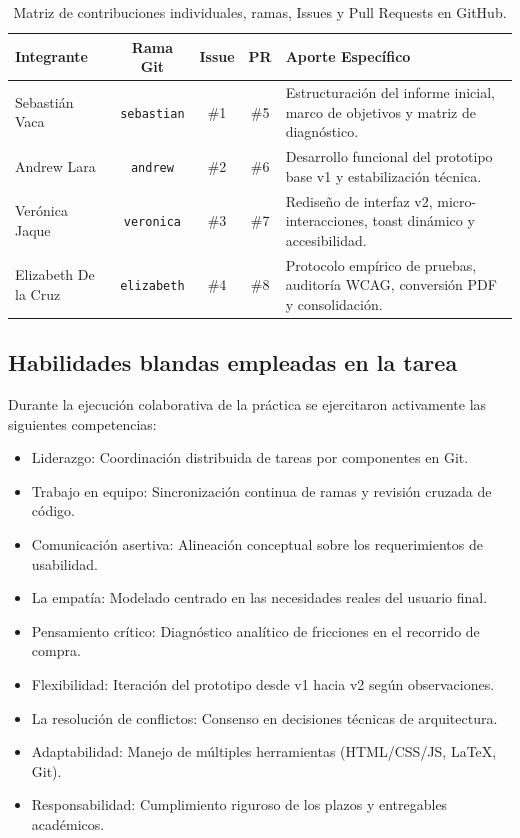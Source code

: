 \documentclass{article}
\begin{document}
\begin{table}[H]
\centering
\caption{Matriz de contribuciones individuales, ramas, Issues y Pull Requests en GitHub.}
\label{tab:github_colaboracion}
\vspace{0.2cm}
\begin{tabularx}{\textwidth}{l c c c X}
\toprule
\textbf{Integrante} & \textbf{Rama Git} & \textbf{Issue} & \textbf{PR} & \textbf{Aporte Específico} \\
\midrule
Sebastián Vaca & \texttt{sebastian} & \#1 & \#5 & Estructuración del informe inicial, marco de objetivos y matriz de diagnóstico. \\
Andrew Lara & \texttt{andrew} & \#2 & \#6 & Desarrollo funcional del prototipo base v1 y estabilización técnica. \\
Verónica Jaque & \texttt{veronica} & \#3 & \#7 & Rediseño de interfaz v2, micro-interacciones, toast dinámico y accesibilidad. \\
Elizabeth De la Cruz & \texttt{elizabeth} & \#4 & \#8 & Protocolo empírico de pruebas, auditoría WCAG, conversión PDF y consolidación. \\
\bottomrule
\end{tabularx}
\end{table}

\subsection{Habilidades blandas empleadas en la tarea}
Durante la ejecución colaborativa de la práctica se ejercitaron activamente las siguientes competencias:
\begin{itemize}
    \item[$\blacksquare$] Liderazgo: Coordinación distribuida de tareas por componentes en Git.
    \item[$\blacksquare$] Trabajo en equipo: Sincronización continua de ramas y revisión cruzada de código.
    \item[$\blacksquare$] Comunicación asertiva: Alineación conceptual sobre los requerimientos de usabilidad.
    \item[$\blacksquare$] La empatía: Modelado centrado en las necesidades reales del usuario final.
    \item[$\blacksquare$] Pensamiento crítico: Diagnóstico analítico de fricciones en el recorrido de compra.
    \item[$\blacksquare$] Flexibilidad: Iteración del prototipo desde v1 hacia v2 según observaciones.
    \item[$\blacksquare$] La resolución de conflictos: Consenso en decisiones técnicas de arquitectura.
    \item[$\blacksquare$] Adaptabilidad: Manejo de múltiples herramientas (HTML/CSS/JS, LaTeX, Git).
    \item[$\blacksquare$] Responsabilidad: Cumplimiento riguroso de los plazos y entregables académicos.
\end{itemize}
\end{document}
